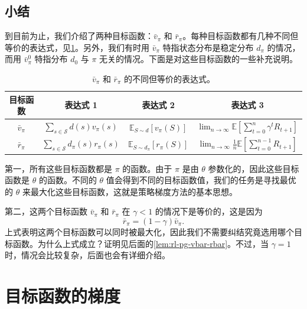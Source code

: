 \subsection*{小结}

到目前为止，我们介绍了两种目标函数：$\bar{v}_{\pi}$ 和 $\bar{r}_{\pi}$。每种目标函数都有几种不同但等价的表达式，见\cref{tab:rl-pg-objectives}。另外，我们有时用 $\bar{v}_{\pi}$ 特指状态分布是稳定分布 $d_{\pi}$ 的情况，而用 $\bar{v}_{\pi}^{0}$ 特指分布 $d_0$ 与 $\pi$ 无关的情况。下面是对这些目标函数的一些补充说明。

\begin{table}[H]\centering
\caption{$\bar{v}_{\pi}$ 和 $\bar{r}_{\pi}$ 的不同但等价的表达式。}
\label{tab:rl-pg-objectives}
\begin{tabular}{cccc}
\toprule
目标函数 & 表达式 1 & 表达式 2 & 表达式 3 \\
\midrule
$\bar{v}_{\pi}$ & $\displaystyle\sum_{s \in \mathcal{S}} d(s) v_{\pi}(s)$ & $\mathbb{E}_{S \sim d}[v_{\pi}(S)]$ & $\displaystyle\lim_{n \to \infty} \mathbb{E}\left[\sum_{t=0}^{n} \gamma^{t} R_{t+1}\right]$ \\[2.2ex]
$\bar{r}_{\pi}$ & $\displaystyle\sum_{s \in \mathcal{S}} d_{\pi}(s) r_{\pi}(s)$ & $\mathbb{E}_{S \sim d_{\pi}}[r_{\pi}(S)]$ & $\displaystyle\lim_{n \to \infty} \frac{1}{n} \mathbb{E}\left[\sum_{t=0}^{n-1} R_{t+1}\right]$ \\
\bottomrule
\end{tabular}
\end{table}

第一，所有这些目标函数都是 $\pi$ 的函数。由于 $\pi$ 是由 $\theta$ 参数化的，因此这些目标函数是 $\theta$ 的函数。不同的 $\theta$ 值会得到不同的目标函数值，我们的任务是寻找最优的 $\theta$ 来最大化这些目标函数，这就是策略梯度方法的基本思想。

第二，这两个目标函数 $\bar{v}_{\pi}$ 和 $\bar{r}_{\pi}$ 在 $\gamma < 1$ 的情况下是等价的，这是因为
\begin{equation}
\bar{r}_{\pi} = (1 - \gamma) \bar{v}_{\pi}.
\end{equation}
上式表明这两个目标函数可以同时被最大化，因此我们不需要纠结究竟选用哪个目标函数。为什么上式成立？证明见后面的\cref{lem:rl-pg-vbar-rbar}。不过，当 $\gamma = 1$ 时，情况会比较复杂，后面也会有详细介绍。

\section{目标函数的梯度}
\label{sec:rl-pg-gradient}

